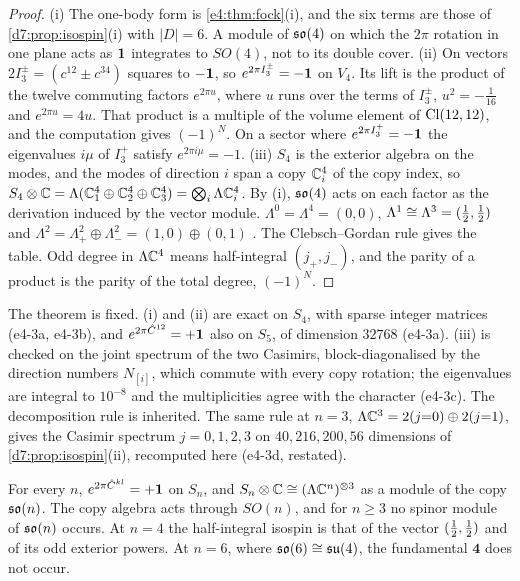 \begin{proof}
(i) The one-body form is \cref{e4:thm:fock}(i), and the six terms are those of \cref{d7:prop:isospin}(i) with $|D|=6$. A module of $\mathfrak{so}(4)$ on which
the $2\pi$ rotation in one plane acts as $\mathbf 1$ integrates to $SO(4)$, not to its double cover. (ii) On vectors $2I^\pm_3=(c^{12}\pm c^{34})$ squares to
$-\mathbf 1$, so $e^{2\pi I^\pm_3}=-\mathbf 1$ on $V_4$. Its lift is the product of the twelve commuting factors $e^{2\pi u}$, where $u$ runs over the terms of
$I^\pm_3$, $u^2=-\tfrac1{16}$ and $e^{2\pi u}=4u$. That product is a multiple of the volume element of $\mathrm{Cl}(12,12)$, and the computation gives $(-1)^N$. On a
sector where $e^{2\pi I^+_3}=-\mathbf 1$ the eigenvalues $i\mu$ of $I^+_3$ satisfy $e^{2\pi i\mu}=-1$. (iii) $S_4$ is the exterior algebra on the modes, and the
modes of direction $i$ span a copy $\mathbb{C}^4_i$ of the copy index, so $S_4\otimes\mathbb{C}=\Lambda(\mathbb{C}^4_1\oplus\mathbb{C}^4_2\oplus\mathbb{C}^4_3)=\bigotimes_i\Lambda\mathbb{C}^4_i$. By (i), $\mathfrak{so}(4)$ acts
on each factor as the derivation induced by the vector module. $\Lambda^0=\Lambda^4=(0,0)$, $\Lambda^1\cong\Lambda^3=(\tfrac12,\tfrac12)$ and
$\Lambda^2=\Lambda^2_+\oplus\Lambda^2_-=(1,0)\oplus(0,1)$ \cite{Humphreys72}. The Clebsch--Gordan rule gives the table. Odd degree in $\Lambda\mathbb{C}^4$ means half-integral
$(j_+,j_-)$, and the parity of a product is the parity of the total degree, $(-1)^N$.
\end{proof}

The theorem is fixed. (i) and (ii) are exact on $S_4$, with sparse integer matrices (e4-3a, e4-3b), and $e^{2\pi\hat C^{12}}=+\mathbf 1$ also on $S_5$, of dimension
$32768$ (e4-3a). (iii) is checked on the joint spectrum of the two Casimirs, block-diagonalised by the direction numbers $N_{[i]}$, which commute with
every copy rotation; the eigenvalues are integral to $10^{-8}$ and the multiplicities agree with the character (e4-3c). The decomposition rule is
inherited. The same rule at $n=3$, $\Lambda\mathbb{C}^3=2(j{=}0)\oplus2(j{=}1)$, gives the Casimir spectrum $j=0,1,2,3$ on $40,216,200,56$ dimensions of
\cref{d7:prop:isospin}(ii), recomputed here (e4-3d, restated).

\begin{corollary}
\label{e4:cor:nospinor}
For every $n$, $e^{2\pi\hat C^{kl}}=+\mathbf 1$ on $S_n$, and $S_n\otimes\mathbb{C}\cong(\Lambda\mathbb{C}^n)^{\otimes3}$ as a module of the copy $\mathfrak{so}(n)$. The copy algebra acts through
$SO(n)$, and for $n\ge3$ no spinor module of $\mathfrak{so}(n)$ occurs. At $n=4$ the half-integral isospin is that of the vector $(\tfrac12,\tfrac12)$ and of its odd
exterior powers. At $n=6$, where $\mathfrak{so}(6)\cong\mathfrak{su}(4)$, the fundamental $\mathbf 4$ does not occur.
\end{corollary}

